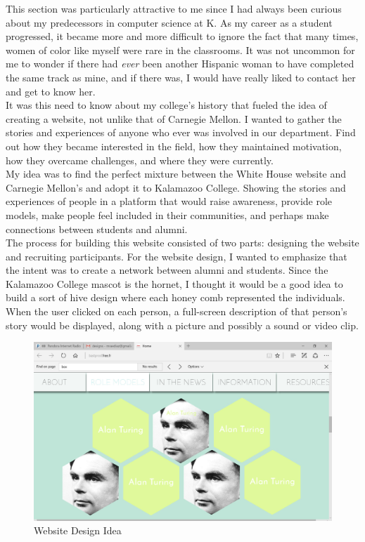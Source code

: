 \documentclass[12pt]{article}
\begin{document}
    
    This section was particularly attractive to me since I had always been curious about my predecessors in computer science at K. As my career as a student progressed, it became more and more difficult to ignore the fact that many times, women of color like myself were rare in the classrooms. It was not uncommon for me to wonder if there had \textit{ever} been another Hispanic woman to have completed the same track as mine, and if there was, I would have really liked to contact her and get to know her.\\
    
    It was this need to know about my college's history that fueled the idea of creating a website, not unlike that of Carnegie Mellon. I wanted to gather the stories and experiences of anyone who ever was involved in our department. Find out how they became interested in the field, how they maintained motivation, how they overcame challenges, and where they were currently. \\
    
    My idea was to find the perfect mixture between the White House website and Carnegie Mellon's and adopt it to Kalamazoo College. Showing the stories and experiences of people in a platform that would raise awareness, provide role models, make people feel included in their communities, and perhaps make connections between students and alumni.\\
    
    The process for building this website consisted of two parts: designing the website and recruiting participants. For the website design, I wanted to emphasize that the intent was to create a network between alumni and students. Since the Kalamazoo College mascot is the hornet, I thought it would be a good idea to build a sort of hive design where each honey comb represented the individuals. When the user clicked on each person, a full-screen description of that person's story would be displayed, along with a picture and possibly a sound or video clip. \\
    
    			\begin{figure}[H]
    				\begin{center}
    					\includegraphics[width=\textwidth,keepaspectratio]{WebsiteDesign}
    					\caption{Website Design Idea}
    				\end{center}
    			\end{figure}
    
\end{document}
